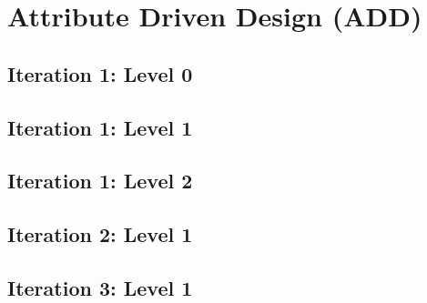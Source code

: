 \section{Attribute Driven Design (ADD)}
\subsection{Iteration 1: Level 0}

\subsection{Iteration 1: Level 1}



%


\subsection{Iteration 1: Level 2}



\subsection{Iteration 2: Level 1}





% 
% 
\subsection{Iteration 3: Level 1}








%
